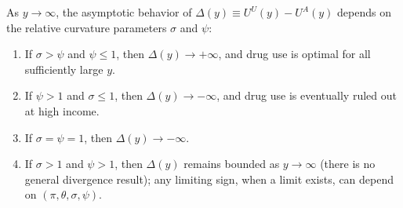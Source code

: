 \begin{lemma}
\label{lem:ggk_income}
As $y\to\infty$, the asymptotic behavior of $\Delta(y)\equiv U^{U}(y)-U^{A}(y)$ depends on the relative curvature parameters $\sigma$ and $\psi$:
\begin{enumerate}
\item If $\sigma>\psi$ and $\psi\le 1$, then $\Delta(y)\to +\infty$, and drug use is optimal for all sufficiently large $y$.
\item If $\psi>1$ and $\sigma\le 1$, then $\Delta(y)\to -\infty$, and drug use is eventually ruled out at high income.
\item If $\sigma=\psi=1$, then $\Delta(y)\to -\infty$.
\item If $\sigma>1$ and $\psi>1$, then $\Delta(y)$ remains bounded as $y\to\infty$ (there is no general divergence result); any limiting sign, when a limit exists, can depend on $(\pi,\theta,\sigma,\psi)$.
\end{enumerate}
\end{lemma}

